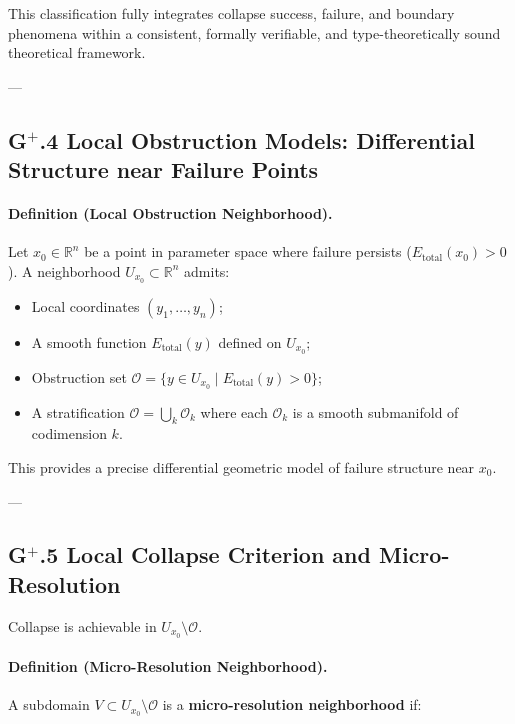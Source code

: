 \documentclass[11pt]{article}
\begin{document}
This classification fully integrates collapse success, failure, and boundary phenomena within a consistent, formally verifiable, and type-theoretically sound theoretical framework.

---

\subsection*{G$^{+}$.4 Local Obstruction Models: Differential Structure near Failure Points}

\paragraph{Definition (Local Obstruction Neighborhood).}

Let $x_0 \in \mathbb{R}^n$ be a point in parameter space where failure persists ($E_{\mathrm{total}}(x_0) > 0$).  
A neighborhood $U_{x_0} \subset \mathbb{R}^n$ admits:

\begin{itemize}
    \item Local coordinates $(y_1, \ldots, y_n)$;
    \item A smooth function $E_{\mathrm{total}}(y)$ defined on $U_{x_0}$;
    \item Obstruction set $\mathcal{O} = \{ y \in U_{x_0} \mid E_{\mathrm{total}}(y) > 0 \}$;
    \item A stratification $\mathcal{O} = \bigcup_{k} \mathcal{O}_k$ where each $\mathcal{O}_k$ is a smooth submanifold of codimension $k$.
\end{itemize}

This provides a precise differential geometric model of failure structure near $x_0$.

---

\subsection*{G$^{+}$.5 Local Collapse Criterion and Micro-Resolution}

Collapse is achievable in $U_{x_0} \setminus \mathcal{O}$.

\paragraph{Definition (Micro-Resolution Neighborhood).}

A subdomain $V \subset U_{x_0} \setminus \mathcal{O}$ is a \textbf{micro-resolution neighborhood} if:
\end{document}
